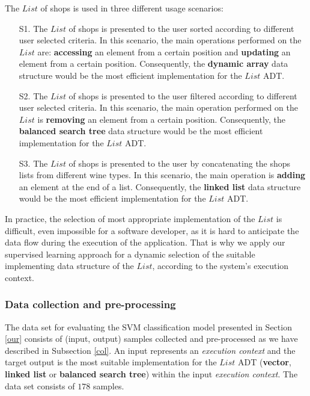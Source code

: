 The $List$ of shops is used in three different usage scenarios:

\begin{enumerate}

\item [S1.] The $List$ of shops is presented to the user sorted according to different user selected criteria. In this scenario, the main operations performed on the $List$ are: \textbf{accessing} an element from a certain position and \textbf{updating} an element from a certain position. Consequently, the \textbf{dynamic array} data structure would be the most efficient implementation for the $List$ ADT.

\item [S2.] The $List$ of shops is presented to the user filtered according to different user selected criteria. In this scenario, the main operation performed on the $List$ is \textbf{removing} an element from a certain position. Consequently, the \textbf{balanced search tree} data structure would be the most efficient implementation for the $List$ ADT.

\item [S3.] The $List$ of shops is presented to the user by concatenating the shops lists from different wine types. In this scenario, the main operation is \textbf{adding} an element at the end of a list. Consequently, the \textbf{linked list} data structure would be the most efficient implementation for the $List$ ADT.

\end{enumerate}

In practice, the selection of most appropriate implementation of the $List$ is difficult, even impossible for a software developer, as it is hard to anticipate the data flow during the execution of the application. That is why we apply our supervised learning approach for a dynamic selection of the suitable implementing data structure of the $List$, according to the system's execution context. 

\subsubsection{Data collection and pre-processing}

The data set for evaluating the SVM classification model presented in Section \ref{our} consists of (input, output) samples collected and pre-processed as we have described in Subsection \ref{col}. An input represents an \emph{execution context} and the target output is the most suitable implementation for the $List$ ADT (\textbf{vector}, \textbf{linked list} or \textbf{balanced search tree}) within the input \emph{execution context}. The data set consists of $178$ samples. 

